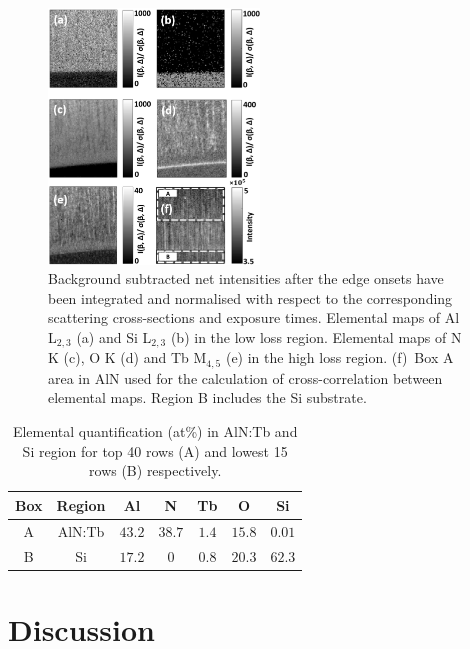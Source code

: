 \documentclass[%
aip,
rsi,%
 amsmath,amssymb,%
 reprint,%
]{revtex4-1}
\begin{document}
\begin{figure}%
    \includegraphics[width=0.5\textwidth]{combined_maps}
    \caption{Background subtracted net intensities after the edge onsets have been integrated and normalised with respect to the corresponding scattering cross-sections and exposure times. Elemental maps of Al L$_{2,3}$ (a) and Si L$_{2,3}$ (b) in the low loss region. Elemental maps of N K (c), O K (d) and Tb M$_{4,5}$ (e) in the high loss region. (f)~Box A area in AlN used for the calculation of cross-correlation between elemental maps. Region B includes the Si substrate.}
    \label{fig:combined_maps}
\end{figure}
\begin{table}%
	\caption{Elemental quantification (at\%) in AlN:Tb and Si region for top 40 rows (A) and lowest 15 rows (B) respectively.}
    \label{tab:atper}
    \begin{ruledtabular}
    	\begin{tabular}{ccccccc}
        	Box&Region&Al&N&Tb&O&Si		 	     			\\ \hline
            A&AlN:Tb&$43.2$&$38.7$&$1.4$&$15.8$&$0.01$   	\\
            B&Si &$17.2$&$0$&$0.8$&$20.3$&$62.3$
    	\end{tabular}
    \end{ruledtabular}
\end{table}

\section{Discussion} %
\label{sec:discussion}
\end{document}
